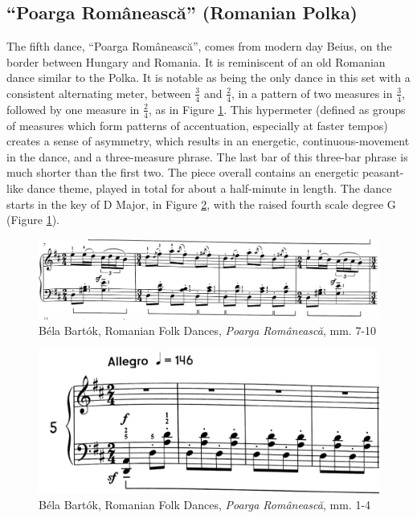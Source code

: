 \subsection{``Poarga Românească'' (Romanian Polka)}

The fifth dance, ``Poarga Românească'', comes from modern day Beius, on the border between Hungary and Romania. It is reminiscent of an old Romanian dance similar to the Polka. It is notable as being the only dance in this set with a consistent alternating meter, between $\frac{3}{4}$ and $\frac{2}{4}$, in a pattern of two measures in $\frac{3}{4}$, followed by one measure in $\frac{2}{4}$, as in Figure \ref{fig:bartok-dance-five-time-signature}\autocite{Lung_2016}. This hypermeter (defined as groups of measures which form patterns of accentuation, especially at faster tempos\autocite{Hughes_Gotham_Hamm_2021}) creates a sense of asymmetry, which results in an energetic, continuous-movement in the dance, and a three-measure phrase. The last bar of this three-bar phrase is much shorter than the first two. The piece overall contains an energetic peasant-like dance theme, played in total for about a half-minute in length. The dance starts in the key of D Major, in Figure \ref{fig:bartok-dance-five-first-four-bars}\autocite{Lung_2016}, with the raised fourth scale degree G\musSharp{} (Figure \ref{fig:bartok-dance-five-time-signature}\autocite{Lung_2016}).

\begin{figure}[h]
  \centering
  \includegraphics[width=\textwidth]{figures/bartok-dance-five-time-signature.jpg}
  \caption{Béla Bartók, Romanian Folk Dances, \textit{Poarga Românească}, mm. 7-10}
  \label{fig:bartok-dance-five-time-signature}
\end{figure}

\begin{figure}[h]
  \centering
  \includegraphics[width=\textwidth]{figures/bartok-dance-five-first-four-bars.jpg}
  \caption{Béla Bartók, Romanian Folk Dances, \textit{Poarga Românească}, mm. 1-4}
  \label{fig:bartok-dance-five-first-four-bars}
\end{figure}

